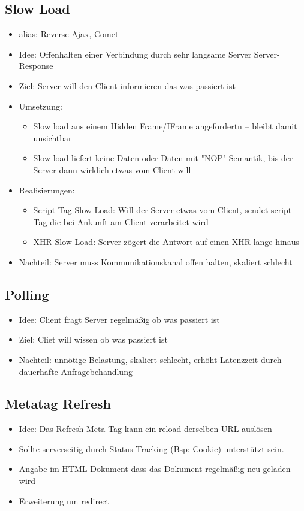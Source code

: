 \documentclass{article} %
\begin{document}
	\subsection{Slow Load}
	\begin{itemize}
		\item alias: Reverse Ajax, Comet
		\item Idee: Offenhalten einer Verbindung durch sehr langsame Server
		Server-Response
		\item Ziel: Server will den Client informieren das was passiert ist
		\item Umsetzung: 
		\begin{itemize}
			\item Slow load aus einem Hidden Frame/IFrame angefordertn – bleibt damit unsichtbar
			\item Slow load liefert keine Daten oder Daten mit "NOP"-Semantik, bis der Server dann wirklich etwas vom Client will
		\end{itemize}
		\item Realisierungen:
		\begin{itemize}
			\item Script-Tag Slow Load: Will der Server etwas vom Client, sendet script-Tag die bei Ankunft am Client verarbeitet wird
			\item XHR Slow Load: Server zögert die Antwort auf einen XHR lange hinaus
		\end{itemize}
		\item Nachteil: Server muss Kommunikationskanal offen halten, skaliert schlecht
	\end{itemize}
	\subsection{Polling}
	\begin{itemize}
		\item Idee: Client fragt Server regelmäßig ob was passiert ist
		\item Ziel: Cliet will wissen ob was passiert ist
		\item Nachteil: unnötige Belastung, skaliert schlecht, erhöht Latenzzeit durch dauerhafte Anfragebehandlung
	\end{itemize}
	\subsection{Metatag Refresh}
	\begin{itemize}
		\item Idee: Das Refresh Meta-Tag kann ein reload derselben URL auslösen
		\item Sollte serverseitig durch Status-Tracking (Bsp: Cookie) unterstützt sein.
		\item Angabe im HTML-Dokument dass das Dokument regelmäßig neu geladen wird
		\item Erweiterung um redirect
	\end{itemize}
\end{document}
